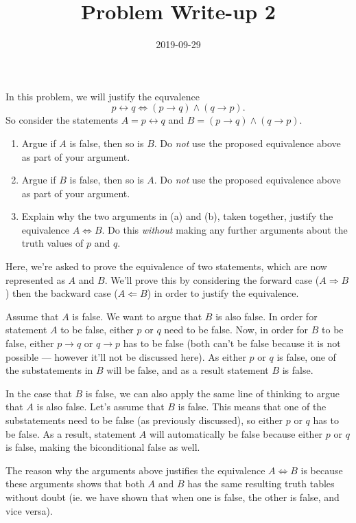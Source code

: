 \documentclass[a4paper,12pt]{article}
\title{Problem Write-up 2}
\date{2019-09-29}
\begin{document}
    \begin{problem}
        In this problem, we will justify the equvalence \[p \leftrightarrow q \Leftrightarrow (p \to q) \wedge (q \to p).\]
        So consider the statements \(A = p \leftrightarrow q\) and \(B = (p \to q) \wedge (q \to p)\).

        \begin{enumerate}
                \item Argue if \(A\) is false, then so is \(B\). Do \textit{not} use the proposed equivalence above as part of your argument.
                \item Argue if \(B\) is false, then so is \(A\). Do \textit{not} use the proposed equivalence above as part of your argument.
                \item Explain why the two arguments in (a) and (b), taken together, justify the equivalence \(A \Leftrightarrow B\). Do this \textit{without} making any further arguments about the truth values of \(p\) and \(q\).
        \end{enumerate}
    \end{problem}

    \begin{answer}
        Here, we're asked to prove the equivalence of two statements, which are now represented as \(A\) and \(B\). We'll prove this by considering the forward case (\(A \Rightarrow B\)) then the backward case (\( A \Leftarrow B \)) in order to justify the equivalence.

        Assume that \(A\) is false. We want to argue that \(B\) is also false. In order for statement \(A\) to be false, either \(p\) or \(q\) need to be false. Now, in order for \(B\) to be false, either \(p \to q\) or \(q \to p\) has to be false (both can't be false because it is not possible --- however it'll not be discussed here). As either \(p\) or \(q\) is false, one of the substatements in \(B\) will be false, and as a result statement \(B\) is false.

        In the case that \(B\) is false, we can also apply the same line of thinking to argue that \(A\) is also false. Let's assume that \(B\) is false. This means that one of the substatements need to be false (as previously discussed), so either \(p\) or \(q\) has to be false. As a result, statement \(A\) will automatically be false because either \(p\) or \(q\) is false, making the biconditional false as well.

        The reason why the arguments above justifies the equivalence \(A \Leftrightarrow B\) is because these arguments shows that both \(A\) and \(B\) has the same resulting truth tables without doubt (ie. we have shown that when one is false, the other is false, and vice versa).
    \end{answer}
\end{document}
